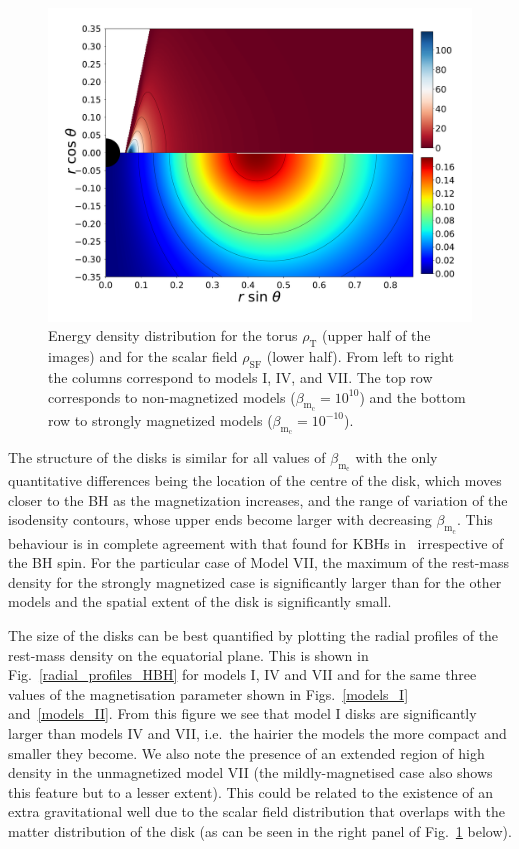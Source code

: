 \documentclass[twocolumn,aps,showpacs,showkeys,prd,superscriptaddress,byrevtex, amsmath]{revtex4-1}
\begin{document}
\begin{figure}
\hspace{-0.3cm}
\includegraphics[scale=0.1267]{figures/fig5_VII__10.pdf}
\hspace{-0.2cm}
\caption{Energy density distribution for the torus $\rho_{\mathrm{T}}$ (upper half of the images) and for the scalar field $\rho_{\mathrm{SF}}$ (lower half). From left to right the columns correspond to models I, IV, and VII. The top row corresponds to non-magnetized models ($\beta_{\mathrm{m}_{\mathrm{c}}} = 10^{10}$) and the bottom row to strongly magnetized models ($\beta_{\mathrm{m}_{\mathrm{c}}} = 10^{-10}$).}
\label{comparison_mass_density}
\end{figure}

The structure of the disks is similar for all values of $\beta_{\mathrm{m_c}}$ with the only quantitative differences being the location of the centre of the disk, which moves closer to the BH as the magnetization increases, and the range of variation of the isodensity contours, whose upper ends become larger with decreasing $\beta_{\mathrm{m_c}}$. This behaviour is in complete agreement with that found for KBHs in~\cite{Gimeno-Soler:2017} irrespective of the BH spin. For the particular case of Model VII, the maximum of the rest-mass density for the strongly magnetized case is significantly larger than for the other models and the spatial extent of the disk is significantly small. 

The size of the disks can be best quantified by plotting the radial profiles of the rest-mass density on the equatorial plane. This is shown in Fig.~\ref{radial_profiles_HBH} for models I, IV and VII and for the same three values of the magnetisation parameter shown in Figs.~\ref{models_I} and~\ref{models_II}. From this figure we see that model I disks are significantly larger than models IV and VII, i.e.~the hairier the models the more compact and smaller they become. We also note the presence of an extended region of high density in the unmagnetized model VII  (the mildly-magnetised case also shows this feature but to a lesser extent). This could be related to the existence of an extra gravitational well due to the scalar field distribution that overlaps with the matter distribution of the disk (as can be seen in the right panel of Fig.~\ref{comparison_mass_density} below).
\end{document}
